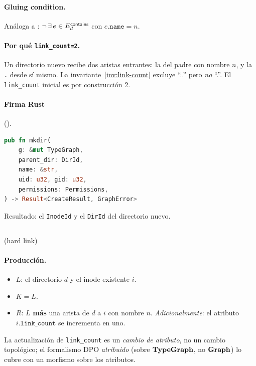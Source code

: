 \paragraph{Gluing condition.} Análoga a \opcreate: $\neg\,\exists\,e \in
E_d^{\textsf{contains}}$ con $e.\texttt{name} = n$.

\paragraph{Por qué \texttt{link\_count=2}.} Un directorio nuevo recibe
dos aristas \econtains{} entrantes: la del padre con nombre $n$, y la
\texttt{.} desde sí mismo. La invariante~\ref{inv:link-count} excluye
``..'' pero \emph{no} ``.''. El \texttt{link\_count} inicial es por
construcción 2.

\paragraph{Firma Rust} ().

\begin{lstlisting}[language=rust]
pub fn mkdir(
    g: &mut TypeGraph,
    parent_dir: DirId,
    name: &str,
    uid: u32, gid: u32,
    permissions: Permissions,
) -> Result<CreateResult, GraphError>
\end{lstlisting}

Resultado: el \texttt{InodeId} y el \texttt{DirId} del directorio nuevo.

\subsection{\oplink} (hard link)

\paragraph{Producción.}

\begin{itemize}
  \item $L$: el directorio $d$ y el inode existente $i$.
  \item $K = L$.
  \item $R$: $L$ \textbf{más} una arista \econtains{} de $d$ a $i$ con
    nombre $n$. \emph{Adicionalmente}: el atributo $i.\texttt{link\_count}$ se
    incrementa en uno.
\end{itemize}

La actualización de \texttt{link\_count} es un \emph{cambio de
atributo}, no un cambio topológico; el formalismo DPO
\emph{atribuido} (sobre $\mathbf{TypeGraph}$, no $\mathbf{Graph}$) lo cubre con un morfismo
sobre los atributos.

